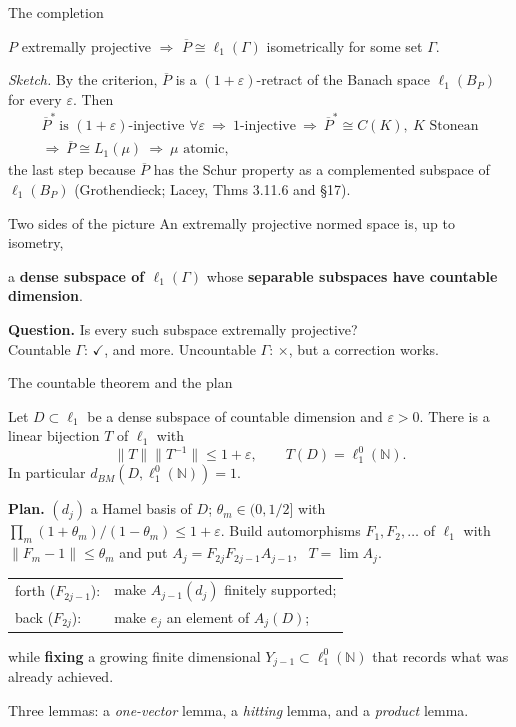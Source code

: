 \documentclass[10pt,aspectratio=169]{beamer}
\newcommand{\lo}[1]{\ell_1^0(#1)}
\newcommand{\ellone}[1]{\ell_1(#1)}
\newcommand{\BM}{d_{BM}}
\newcommand{\NN}{\mathbb N}
\newcommand{\yes}{\textcolor{good}{$\checkmark$}}
\newcommand{\no}{\textcolor{accent}{$\boldsymbol\times$}}
\begin{document}
\begin{frame}{The completion}
  \begin{theorem}[Helemskii 2013; Gr{\o}nb{\ae}k 2016]
    $P$ extremally projective $\Rightarrow$ $\overline P\cong\ellone\Gamma$
    isometrically for some set $\Gamma$.
  \end{theorem}
  \textit{Sketch.} By the criterion, $\overline P$ is a $(1+\varepsilon)$-retract
  of the Banach space $\ellone{B_P}$ for every $\varepsilon$. Then
  \begin{gather*}
    {\overline P}^*\ \text{is $(1+\varepsilon)$-injective }\forall\varepsilon
    \ \Rightarrow\ \text{$1$-injective}
    \ \Rightarrow\ {\overline P}^*\cong C(K),\ K\text{ Stonean}\\
    \Rightarrow\ \overline P\cong L_1(\mu)
    \ \Rightarrow\ \mu\text{ atomic},
  \end{gather*}
  the last step because $\overline P$ has the Schur property as a complemented
  subspace of $\ellone{B_P}$ (Grothendieck; Lacey, Thms 3.11.6 and \S17).

  \begin{block}{Two sides of the picture}
    An extremally projective normed space is, up to isometry,
    \begin{center}
      a \textbf{dense subspace of $\ellone\Gamma$}
      \quad whose \quad
      \textbf{separable subspaces have countable dimension}.
    \end{center}
  \end{block}
  \textbf{Question.} Is every such subspace extremally projective? \\
  Countable $\Gamma$: \yes, and more. \quad Uncountable $\Gamma$: \no, but
  a correction works.
\end{frame}

\begin{frame}{The countable theorem and the plan}
  \begin{theorem}
    Let $D\subset\ell_1$ be a dense subspace of countable dimension and
    $\varepsilon>0$. There is a linear bijection $T$ of $\ell_1$ with
    \[
      \|T\|\|T^{-1}\|\le1+\varepsilon,\qquad T(D)=\lo\NN .
    \]
    In particular $\BM(D,\lo\NN)=1$.
  \end{theorem}
  \textbf{Plan.} $(d_j)$ a Hamel basis of $D$; $\theta_m\in(0,1/2]$ with
  $\prod_m(1+\theta_m)/(1-\theta_m)\le1+\varepsilon$. Build automorphisms
  $F_1,F_2,\dots$ of $\ell_1$ with $\|F_m-1\|\le\theta_m$ and put
  $A_j=F_{2j}F_{2j-1}A_{j-1}$, \ $T=\lim A_j$.
  \medskip

  \begin{tabular}{@{}ll@{}}
    \textcolor{accent}{forth} ($F_{2j-1}$): & make $A_{j-1}(d_j)$ finitely supported;\\[2pt]
    \textcolor{good}{back} ($F_{2j}$): & make $e_j$ an element of $A_j(D)$;
  \end{tabular}
  \medskip

  while \textbf{fixing} a growing finite dimensional $Y_{j-1}\subset\lo\NN$
  that records what was already achieved.
  \medskip

  Three lemmas: a \emph{one-vector} lemma, a \emph{hitting} lemma, and a
  \emph{product} lemma.
\end{frame}
\end{document}
